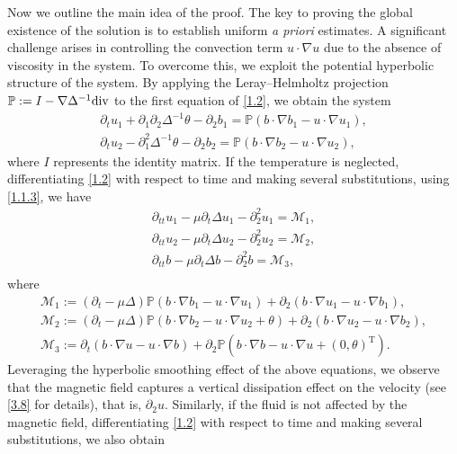 \documentclass[reqno]{amsart}
\begin{document}
Now we outline the main idea of the proof. The key to proving the global existence of the solution is to
establish uniform \emph{a priori} estimates. A significant challenge arises in controlling the convection
term $u\cdot\nabla u$ due to the absence of viscosity in the system. To overcome this, we exploit the
potential hyperbolic structure of the system. By applying the Leray--Helmholtz projection
$\mathbb{P}:=I-\nabla\Delta^{-1}{\rm div}$ to the first equation of \eqref{1.2}, we obtain the system
\begin{equation} \label{1.1.3}
\begin{gathered}
\partial_tu_1+\partial_1\partial_2\Delta^{-1}\theta-\partial_2b_1=\mathbb{P}(b\cdot\nabla b_1-u\cdot\nabla u_1),\\
\partial_tu_2-\partial_1^2\Delta^{-1}\theta-\partial_2b_2=\mathbb{P}(b\cdot\nabla b_2-u\cdot\nabla u_2),
\end{gathered}
\end{equation}
where $I$ represents the identity matrix.
If the temperature is neglected, differentiating \eqref{1.2} with respect to time and making several substitutions, using \eqref{1.1.3}, we have
\begin{equation} \label{1.7}
\begin{gathered}
\partial_{tt}u_1-\mu\partial_t\Delta u_1-\partial_2^2u_1=\mathcal{M}_1,\\
\partial_{tt}u_2-\mu\partial_t\Delta u_2-\partial_2^2u_2=\mathcal{M}_2,\\
\partial_{tt}b-\mu\partial_t\Delta b-\partial_2^2b=\mathcal{M}_3,\\
\end{gathered}
\end{equation}
where
\begin{gather*}
\mathcal{M}_1:=(\partial_t-\mu\Delta)\mathbb{P}(b\cdot\nabla b_1-u\cdot\nabla u_1)+\partial_2(b\cdot\nabla u_1-u\cdot\nabla b_1),\\
\mathcal{M}_2:=(\partial_t-\mu\Delta)\mathbb{P}(b\cdot\nabla b_2-u\cdot\nabla u_2+\theta)+\partial_2(b\cdot\nabla u_2-u\cdot\nabla b_2),\\
\mathcal{M}_3:=\partial_t(b\cdot\nabla u-u\cdot\nabla b)+\partial_2\mathbb{P}(b\cdot\nabla b-u\cdot\nabla u+(0,\theta)^\mathrm{T}).
\end{gather*}
Leveraging the hyperbolic smoothing effect of the above equations, we observe that the magnetic
field captures a vertical dissipation effect on the velocity (see \eqref{3.8} for details), that is,
$\partial_2u$. Similarly, if the fluid is not affected by the magnetic field, differentiating \eqref{1.2} with respect to time and making several substitutions, we also obtain
\end{document}
